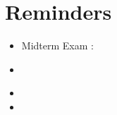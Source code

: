 
\section*{Reminders}

\begin{itemize}
	\item[$\square$] Midterm Exam : 
\end{itemize}

\begin{itemize}
	\item[$\square$]
\end{itemize}

\begin{itemize}
	\item[$\square$]
	\item[$\square$]
\end{itemize}

